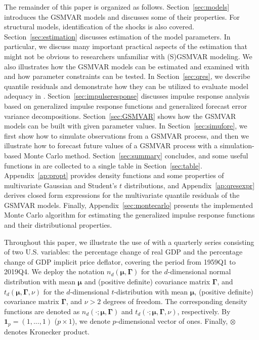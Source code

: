 \documentclass[nojss]{jss}
\begin{document}
The remainder of this paper is organized as follows. Section~\ref{sec:models} introduces the GSMVAR models and discusses some of their properties. For structural models, identification of the shocks is also covered. Section~\ref{sec:estimation} discusses estimation of the model parameters. In particular, we discuss many important practical aspects of the estimation that might not be obvious to researchers unfamiliar with (S)GSMVAR modeling. We also illustrates how the GSMVAR models can be estimated and examined with  and how parameter constraints can be tested.  In Section~\ref{sec:qres}, we describe quantile residuals and demonstrate how they can be utilized to evaluate model adequacy in . Section~\ref{sec:impulseresponse} discusses impulse response analysis based on generalized impulse response functions and generalized forecast error variance decompositions. Section~\ref{sec:GSMVAR} shows how the GSMVAR models can be built with given parameter values. In Section~\ref{sec:simufore}, we first show how to simulate observations from a GSMVAR process, and then we illustrate how to forecast future values of a GSMVAR process with a simulation-based Monte Carlo method. Section~\ref{sec:summary} concludes, and some useful functions in  are collected to a single table in Section~\ref{sec:table}. Appendix~\ref{ap:propt} provides density functions and some properties of multivariate Gaussian and Student's $t$ distributions, and Appendix~\ref{ap:qresexpr} derives closed form expressions for the multivariate quantile residuals of the GSMVAR models. Finally, Appendix~\ref{sec:montecarlo} presents the implemented Monte Carlo algorithm for estimating the generalized impulse response functions and their distributional properties.

Throughout this paper, we illustrate the use of  with a quarterly series consisting of two U.S. variables: the percentage change of real GDP and the percentage change of GDP implicit price deflator, covering the period from 1959Q1 to 2019Q4. We deploy the notation $n_d(\boldsymbol{\mu},\boldsymbol{\Gamma})$ for the $d$-dimensional normal distribution with mean $\boldsymbol{\mu}$ and (positive definite) covariance matrix $\boldsymbol{\Gamma}$, and $t_d(\boldsymbol{\mu},\boldsymbol{\Gamma},\nu)$ for the $d$-dimensional $t$-distribution with mean $\boldsymbol{\mu}$, (positive definite) covariance matrix $\boldsymbol{\Gamma}$, and $\nu>2$ degrees of freedom. The corresponding density functions are denoted as $n_d(\cdot;\boldsymbol{\mu},\boldsymbol{\Gamma})$ and $t_d(\cdot;\boldsymbol{\mu},\boldsymbol{\Gamma},\nu)$, respectively. By $\boldsymbol{1}_p=(1,...,1)$ ($p \times 1$), we denote $p$-dimensional vector of ones. Finally, $\otimes$ denotes Kronecker product.
\end{document}
